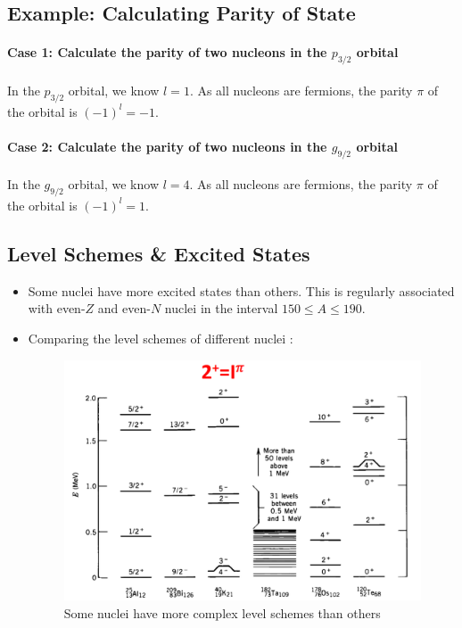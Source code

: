 \subsection{Example: Calculating Parity of State}
\paragraph{Case 1: Calculate the parity of two nucleons in the $p_{3 /2}$ orbital} 
In the $p_{3 /2}$ orbital, we know $l = 1$. As all nucleons are fermions, the parity $π$ of the orbital is $(-1)^l = -1$.
\paragraph{Case 2: Calculate the parity of two nucleons in the $g_{9 /2}$ orbital}
In the $g_{9 /2}$ orbital, we know $l = 4$. As all nucleons are fermions, the parity $π$ of the orbital is $(-1)^l = 1$.

\subsection{Level Schemes \& Excited States}
\begin{itemize}
    \item Some nuclei have more excited states than others. This is regularly associated with even-$Z$ and even-$N$ nuclei in the interval $150 ≤ A ≤ 190$. 
    \item Comparing the level schemes of different nuclei : 
    \begin{figure}[h!]
    \centering
    \includegraphics[width = .75\textwidth]{nuclei_excitation_levels_comparison.png}
    \caption{Some nuclei have more complex level schemes than others}
    \label{fig: nuclei_excitation_levels_comparison}
    \end{figure}
    
\end{itemize}


